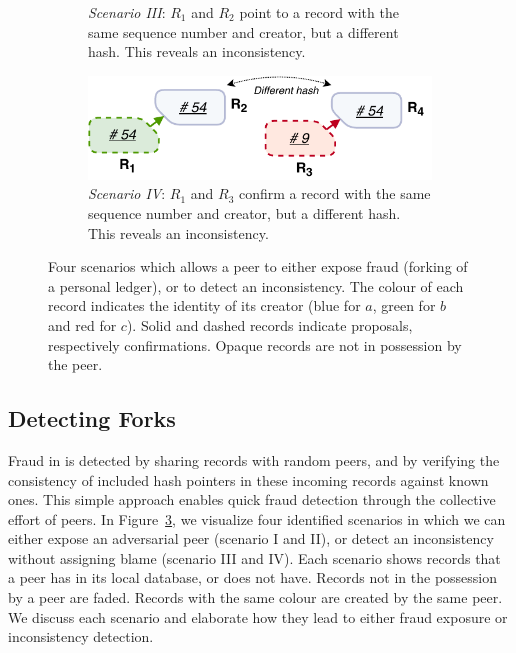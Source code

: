 \begin{figure}[t!]
\begin{subfigure}[t]{.5\textwidth}
		\caption{\emph{Scenario III}: $ R_1 $ and $ R_2 $ point to a record with the same sequence number and creator, but a different hash. This reveals an inconsistency.}
		\label{fig:fraud_scenario_3}\vspace{0.9cm}
	\end{subfigure}
	\begin{subfigure}[t]{.6\textwidth}
		\centering
		\captionsetup{width=.93\linewidth}
		\includegraphics[width=.98\linewidth]{trustchain/assets/fraud_scenario_4}
		\caption{\emph{Scenario IV}: $ R_1 $ and $ R_3 $ confirm a record with the same sequence number and creator, but a different hash. This reveals an inconsistency.}
		\label{fig:fraud_scenario_4}
	\end{subfigure}
	\caption{Four scenarios which allows a peer to either expose fraud (forking of a personal ledger), or to detect an inconsistency. The colour of each record indicates the identity of its creator (blue for $ a $, green for $ b $ and red for $ c $). Solid and dashed records indicate proposals, respectively confirmations. Opaque records are not in possession by the peer.}
	\label{fig:fraud_scenarios}
\end{figure}

\subsection{Detecting Forks}
\label{sec:detecting_forks}
Fraud in \ModelName{} is detected by sharing records with random peers, and by verifying the consistency of included hash pointers in these incoming records against known ones.
This simple approach enables quick fraud detection through the collective effort of peers.
In Figure~\ref{fig:fraud_scenarios}, we visualize four identified scenarios in which we can either expose an adversarial peer (scenario I and II), or detect an inconsistency without assigning blame (scenario III and IV).
Each scenario shows records that a peer has in its local database, or does not have.
Records not in the possession by a peer are faded.
Records with the same colour are created by the same peer.
We discuss each scenario and elaborate how they lead to either fraud exposure or inconsistency detection.

